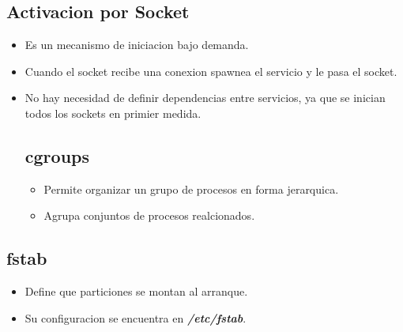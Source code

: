 \documentclass[11pt]{article}
\begin{document}
\subsection{Activacion por Socket}
\begin{itemize}
    \item Es un mecanismo de iniciacion bajo demanda.
    \item Cuando el socket recibe una conexion spawnea el servicio y le pasa el socket.
    \item No hay necesidad de definir dependencias entre servicios, ya que se inician todos los sockets en primier medida.

\subsection{cgroups}
\begin{itemize}
    \item Permite organizar un grupo de procesos en forma jerarquica.
    \item Agrupa conjuntos de procesos realcionados.
\end{itemize}
\end{itemize}

\subsection{fstab}

\begin{itemize}
    \item Define que particiones se montan al arranque.
    \item Su configuracion se encuentra en \textbf{\textit{/etc/fstab}}.
\end{itemize}
\end{document}
